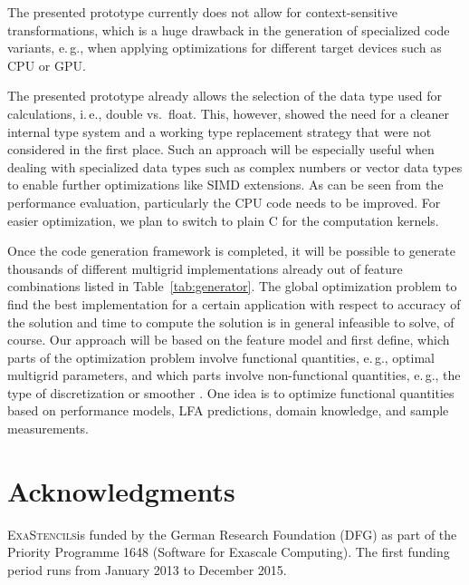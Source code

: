 \documentclass[onecolumn]{svjour3}
\newcommand{\exastencils}{\textsc{ExaStencils}}
\begin{document}
The presented prototype currently does not allow for context-sensitive transformations, which is a huge drawback in the generation of specialized code variants, e.\,g., when applying optimizations for different target devices such as CPU or GPU.

The presented prototype already allows the selection of the data type used for calculations, i.\,e., double vs.\ float.
This, however, showed the need for a cleaner internal type system and a working type replacement strategy that were not considered in the first place.
Such an approach will be especially useful when dealing with specialized data types such as complex numbers or vector data types to enable further optimizations like SIMD extensions.
As can be seen from the performance evaluation, particularly the CPU code needs to be improved.
For easier optimization, we plan to switch to plain C for the computation kernels.

Once the code generation framework is completed, it will be possible to generate thousands of different multigrid implementations already out of feature combinations listed in Table~\ref{tab:generator}. The global optimization problem to find the best implementation for a certain application with respect to accuracy of the solution and time to compute the solution is in general infeasible to solve, of course. 
Our approach will be based on the feature model and first define, which parts of the optimization problem involve functional quantities, e.\,g., optimal multigrid parameters, and which parts involve non-functional quantities, e.\,g., the type of discretization or smoother \cite{koestlerapelhistencils13}. 
One idea is to optimize functional quantities based on performance models, LFA predictions, domain knowledge, and sample measurements. 





\section{Acknowledgments}

\exastencils is funded by the German Research Foundation (DFG) as part of the Priority Programme 1648 (Software for Exascale Computing). The first funding period runs from January 2013 to December 2015. 
\end{document}
